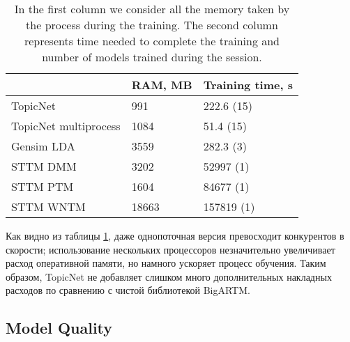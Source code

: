 \begin{table}[h]

\begin{tabular}{|l|l|l|}

\hline

                      & \multicolumn{1}{c|}{RAM, MB} & \multicolumn{1}{c|}{Training time, s} \\ \hline

TopicNet              & 991                         & 222.6 (15)                             \\ \hline

TopicNet multiprocess & 1084                        & 51.4 (15)                              \\ \hline

Gensim LDA            & 3559                        & 282.3 (3)                              \\ \hline

STTM DMM              & 3202                        & 52997 (1)                              \\ \hline

STTM PTM              & 1604                        & 84677 (1)                              \\ \hline

STTM WNTM             & 18663                       & 157819 (1)                             \\ \hline

\end{tabular}

\caption{In the first column we consider all the memory taken by the process during the training. The second column represents time needed to complete the training and number of models trained during the session.}

\label{performance-benchmark}

\end{table} 

Как видно из таблицы \ref{performance-benchmark}, даже однопоточная версия превосходит конкурентов в скорости; использование нескольких процессоров незначительно увеличивает расход оперативной памяти, но намного ускоряет процесс обучения. Таким образом, TopicNet не добавляет слишком много дополнительных накладных расходов по сравнению с чистой библиотекой BigARTM.  

\subsection{Model Quality} 

